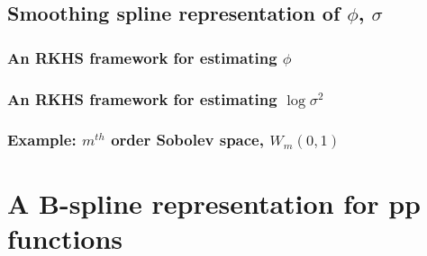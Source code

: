 \documentclass[12pt]{article}
\theoremstyle{definition}
\begin{document}


\subsection{Smoothing spline representation of $\phi$, $\sigma$}


\subsubsection{An RKHS framework for estimating $\phi$}


\subsubsection{An RKHS framework for estimating $\log \sigma^2$}


\subsubsection{Example: $m^{th}$ order Sobolev space, $W_m\left(0,1\right)$}





%

\section{A B-spline representation for pp functions}
\end{document}
